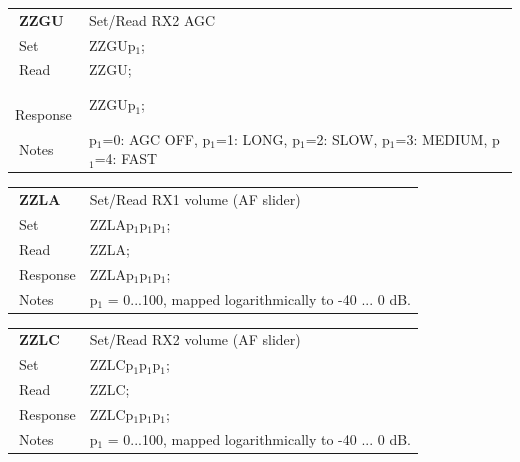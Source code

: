 \documentclass[12pt]{book}
\begin{document}
\begin{center}
\begin{tabular}{|p{2cm}|p{11cm}|}
\toprule
$\phantom{\Big|}$\textbf{\large ZZGU} & Set/Read RX2 AGC \\\cline{1-2}
$\phantom{\Big|}${\large Set} & {ZZGUp$_1$;} \\\hline
$\phantom{\Big|}${\large Read} & {ZZGU;} \\\hline
$\phantom{\Big|}${\large Response} & {ZZGUp$_1$;} \\\hline
$\phantom{\Big|}${\large Notes} & \multicolumn{1}{|p{11cm}|}{p$_1$=0: AGC OFF, p$_1$=1: LONG, p$_1$=2: SLOW, p$_1$=3: MEDIUM, p$_1$=4: FAST} \\
\bottomrule
\end{tabular}
\end{center}

\begin{center}
\begin{tabular}{|p{2cm}|p{11cm}|}
\toprule
$\phantom{\Big|}$\textbf{\large ZZLA} & Set/Read RX1 volume (AF slider) \\\cline{1-2}
$\phantom{\Big|}${\large Set} & {ZZLAp$_1$p$_1$p$_1$;} \\\hline
$\phantom{\Big|}${\large Read} & {ZZLA;} \\\hline
$\phantom{\Big|}${\large Response} & {ZZLAp$_1$p$_1$p$_1$;} \\\hline
$\phantom{\Big|}${\large Notes} & \multicolumn{1}{|p{11cm}|}{p$_1$ = 0...100, mapped logarithmically to -40 ... 0 dB.} \\
\bottomrule
\end{tabular}
\end{center}

\begin{center}
\begin{tabular}{|p{2cm}|p{11cm}|}
\toprule
$\phantom{\Big|}$\textbf{\large ZZLC} & Set/Read RX2 volume (AF slider) \\\cline{1-2}
$\phantom{\Big|}${\large Set} & {ZZLCp$_1$p$_1$p$_1$;} \\\hline
$\phantom{\Big|}${\large Read} & {ZZLC;} \\\hline
$\phantom{\Big|}${\large Response} & {ZZLCp$_1$p$_1$p$_1$;} \\\hline
$\phantom{\Big|}${\large Notes} & \multicolumn{1}{|p{11cm}|}{p$_1$ = 0...100, mapped logarithmically to -40 ... 0 dB.} \\
\bottomrule
\end{tabular}
\end{center}
\end{document}
